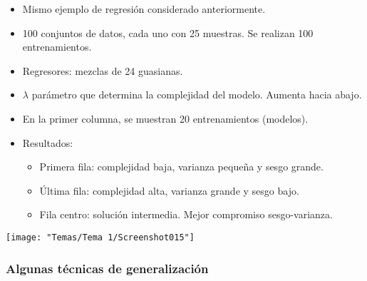 \begin{minipage}{0.5\textwidth}
	\begin{itemize}
		\item Mismo ejemplo de regresión considerado anteriormente.
		\item 100 conjuntos de datos, cada uno con 25 muestras. Se realizan 100 entrenamientos.
		\item Regresores: mezclas de 24 guasianas.
		\item $\lambda$ parámetro que determina la complejidad del modelo. Aumenta hacia abajo.
		\item En la primer columna, se muestran 20 entrenamientos (modelos).
		\item Resultados:
		\begin{itemize}
			\item Primera fila: complejidad baja, varianza pequeña y sesgo grande.
			\item Última fila: complejidad alta, varianza grande y sesgo bajo.
			\item Fila centro: solución intermedia. Mejor compromiso sesgo-varianza.
		\end{itemize}
	\end{itemize}
\end{minipage}\qquad\begin{minipage}{0.45\textwidth}
	\begin{center}
		\texttt{[image: "Temas/Tema 1/Screenshot015"]}
	\end{center}
\end{minipage}
\subsubsection{Algunas técnicas de generalización}

